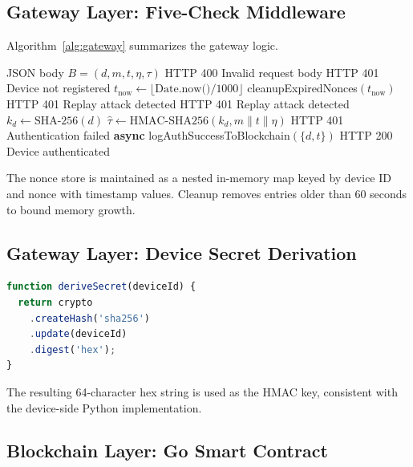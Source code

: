 \documentclass[conference]{IEEEtran}
\begin{document}
\subsection{Gateway Layer: Five-Check Middleware}

Algorithm~\ref{alg:gateway} summarizes the gateway logic.

\begin{algorithm}[htbp]
\caption{Gateway Authentication (POST /auth)}
\label{alg:gateway}
\begin{algorithmic}[1]
\REQUIRE JSON body $B=(d,m,t,\eta,\tau)$
    \RETURN HTTP 400 Invalid request body
\ENDIF
{}
    \RETURN HTTP 401 Device not registered
\ENDIF
\STATE $t_{\text{now}} \leftarrow \lfloor\text{Date.now()}/1000\rfloor$
\STATE cleanupExpiredNonces$(t_{\text{now}})$
    \RETURN HTTP 401 Replay attack detected
\ENDIF
{}
    \RETURN HTTP 401 Replay attack detected
\ENDIF
\STATE $k_d \leftarrow \text{SHA-256}(d)$
\STATE $\hat{\tau} \leftarrow \text{HMAC-SHA256}(k_d,m\|t\|\eta)$
    \RETURN HTTP 401 Authentication failed
\ENDIF
\STATE \textbf{async} logAuthSuccessToBlockchain$(\{d,t\})$
\RETURN HTTP 200 Device authenticated
\end{algorithmic}
\end{algorithm}

The nonce store is maintained as a nested in-memory map keyed by device ID and nonce with timestamp values. Cleanup removes entries older than 60 seconds to bound memory growth.

\subsection{Gateway Layer: Device Secret Derivation}

\begin{lstlisting}[language=JavaScript,caption={Secret derivation in gateway authentication service}]
function deriveSecret(deviceId) {
  return crypto
    .createHash('sha256')
    .update(deviceId)
    .digest('hex');
}
\end{lstlisting}

The resulting 64-character hex string is used as the HMAC key, consistent with the device-side Python implementation.

\subsection{Blockchain Layer: Go Smart Contract}
\end{document}
